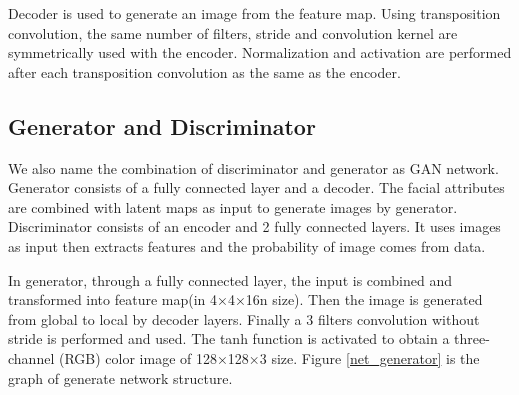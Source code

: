 Decoder is used to generate an image from the feature map.
Using transposition convolution, the same number of filters,
    stride and convolution kernel are symmetrically used with the encoder.
Normalization and activation are performed after each transposition convolution as the same as the encoder.

\subsection{Generator and Discriminator}

We also name the combination of discriminator and generator as GAN network.
Generator consists of a fully connected layer and a decoder.
The facial attributes are combined with latent maps as input to generate images by generator.
Discriminator consists of an encoder and 2 fully connected layers.
It uses images as input then extracts features and the probability of image comes from data.


In generator, through a fully connected layer, the input is combined and transformed into feature map(in 4×4×16n size).
Then the image is generated from global to local by decoder layers.
Finally a 3 filters convolution without stride is performed and used.
The tanh function is activated to obtain a three-channel (RGB) color image of 128×128×3 size.
Figure \ref{net_generator} is the graph of generate network structure.

